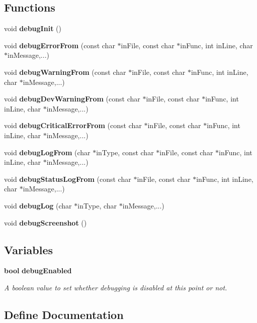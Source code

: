 \subsection*{Functions}
\begin{CompactItemize}
\item 
void {\bf debug\-Init} ()
\item 
void {\bf debug\-Error\-From} (const char $\ast$in\-File, const char $\ast$in\-Func, int in\-Line, char $\ast$in\-Message,...)
\item 
void {\bf debug\-Warning\-From} (const char $\ast$in\-File, const char $\ast$in\-Func, int in\-Line, char $\ast$in\-Message,...)
\item 
void {\bf debug\-Dev\-Warning\-From} (const char $\ast$in\-File, const char $\ast$in\-Func, int in\-Line, char $\ast$in\-Message,...)
\item 
void {\bf debug\-Critical\-Error\-From} (const char $\ast$in\-File, const char $\ast$in\-Func, int in\-Line, char $\ast$in\-Message,...)
\item 
void {\bf debug\-Log\-From} (char $\ast$in\-Type, const char $\ast$in\-File, const char $\ast$in\-Func, int in\-Line, char $\ast$in\-Message,...)
\item 
void {\bf debug\-Status\-Log\-From} (const char $\ast$in\-File, const char $\ast$in\-Func, int in\-Line, char $\ast$in\-Message,...)
\item 
void {\bf debug\-Log} (char $\ast$in\-Type, char $\ast$in\-Message,...)
\item 
void {\bf debug\-Screenshot} ()
\end{CompactItemize}
\subsection*{Variables}
\begin{CompactItemize}
\item 
{\bf bool} {\bf debug\-Enabled}
\begin{CompactList}\small\item\em A boolean value to set whether debugging is disabled at this point or not. \item\end{CompactList}\end{CompactItemize}


\subsection{Define Documentation}
